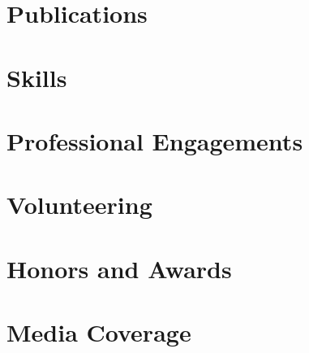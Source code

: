 	
	
		
	
		
	
		

	\section{Publications}
	
	

	\section{Skills}

	

	\section{Professional Engagements}

	

	\section{Volunteering}

	
	
	\section{Honors and Awards}
	
	

	\section{Media Coverage}

	
	


